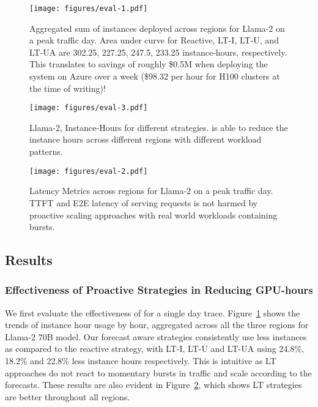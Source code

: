 \begin{figure}[t!]
    \centering
\texttt{[image: figures/eval-1.pdf]}
    \caption{Aggregated sum of instances deployed across regions for Llama-2 on a peak traffic day. %
    Area under curve for Reactive, LT-I, LT-U, and LT-UA are 302.25, 227.25, 247.5, 233.25 instance-hours, respectively. This translates to savings of roughly \$0.5M when deploying the system on Azure over a week (\$98.32 per hour for H100 clusters at the time of writing)! 
    }
    \label{fig:instance-hours-curve}
\end{figure}

\begin{figure}[t!]
    \centering
\texttt{[image: figures/eval-3.pdf]}
    \caption{Llama-2, Instance-Hours for different strategies. \sys is able to reduce the instance hours across different regions with different workload patterns.}
    \label{fig:instance-hours-bar}
\end{figure}


\begin{figure}[t!]
    \centering
\texttt{[image: figures/eval-2.pdf]}
    \caption{Latency Metrics across regions for Llama-2 on a peak traffic day. TTFT and E2E latency of serving requests is not harmed by proactive scaling approaches with real world workloads containing bursts.}
    \label{fig:latency_metrics}
\end{figure}


\subsection{Results}
\subsubsection{Effectiveness of Proactive Strategies in Reducing GPU-hours}\label{sec:overallperf}
We first evaluate the effectiveness of \sys for a single day trace. Figure~\ref{fig:instance-hours-curve} shows the trends of instance hour usage by hour, aggregated across all the three regions for Llama-2 70B model. Our forecast aware strategies consistently use less instances as compared to the reactive strategy, with LT-I, LT-U and LT-UA using 24.8\%, 18.2\% and 22.8\% less instance hours respectively. This is intuitive as LT approaches do not react to momentary bursts in traffic and scale according to the forecasts. These results are also evident in Figure~\ref{fig:instance-hours-bar}, which shows LT strategies are better throughout all regions. 

